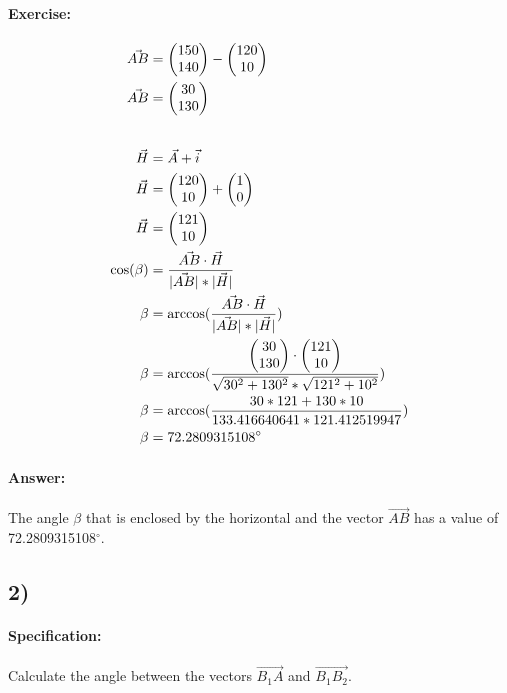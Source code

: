 \paragraph{Exercise:} 
\begin{align}
    \vec{AB} &= \begin{pmatrix} 150 \\ 140 \end{pmatrix} - \begin{pmatrix} 120 \\ 10 \end{pmatrix} \\
    \vec{AB} &= \begin{pmatrix} 30 \\ 130 \end{pmatrix} \\[20pt]
    \vec{H} &= \vec{A} + \vec{i} \\
    \vec{H} &= \begin{pmatrix} 120 \\ 10 \end{pmatrix}  + \begin{pmatrix} 1 \\ 0 \end{pmatrix} \\
    \vec{H} &= \begin{pmatrix} 121 \\ 10 \end{pmatrix} \\
    \cos(\beta) &= \frac{\vec{AB} \cdot \vec{H}}{|\vec{AB}| * |\vec{H}|} \\
    \beta &= \arccos(\frac{\vec{AB} \cdot \vec{H}}{|\vec{AB}| * |\vec{H}|}) \\
    \beta &= \arccos(\frac{\begin{pmatrix} 30 \\ 130 \end{pmatrix} \cdot \begin{pmatrix} 121 \\ 10 \end{pmatrix}}{\sqrt{30^2 + 130^2} * \sqrt{121^2+ 10^2}}) \\
    \beta &= \arccos(\frac{30 * 121 + 130 * 10}{133.416640641 * 121.412519947}) \\
    \beta &= 72.2809315108^\circ
\end{align}

\paragraph{Answer:} 
The angle $\beta$ that is enclosed by the horizontal and the vector $\vec{AB}$ has a value
of 72.2809315108$^\circ$.

\subsection{2)}

\paragraph{Specification:}
Calculate the angle between the vectors $\vec{B_1A}$ and $\vec{B_1B_2}$.

\def\vBOneA{\begin{pmatrix}
    -30 \\ 
    110 
\end{pmatrix}}

\def\vBOneBTwo{\begin{pmatrix}
    350 \\ 
    110
\end{pmatrix}}

